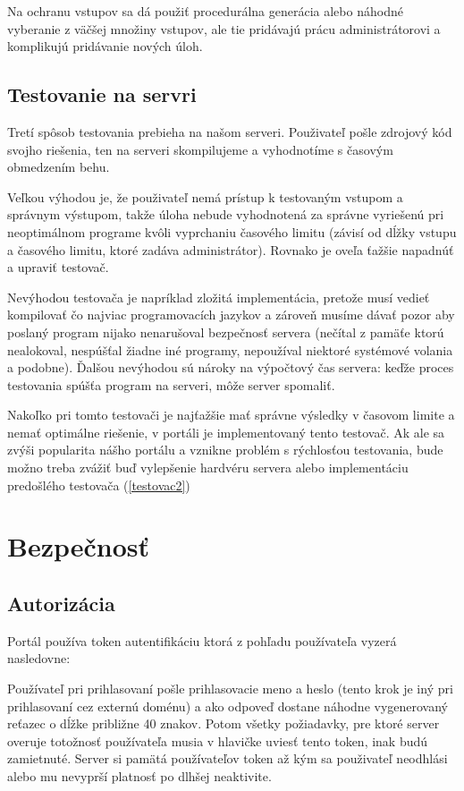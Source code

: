 Na ochranu vstupov sa dá použiť procedurálna generácia alebo náhodné vyberanie z väčšej množiny vstupov, ale tie pridávajú prácu administrátorovi a komplikujú pridávanie nových úloh.

\subsection{Testovanie na servri}
Tretí spôsob testovania prebieha na našom serveri. Použivateľ pošle zdrojový kód svojho riešenia, ten na serveri skompilujeme a vyhodnotíme s časovým obmedzením behu.

Veľkou výhodou je, že použivateľ nemá prístup k testovaným vstupom a správnym výstupom, takže úloha nebude vyhodnotená za správne vyriešenú pri neoptimálnom programe kvôli vyprchaniu časového limitu (závisí od dĺžky vstupu a časového limitu, ktoré zadáva administrátor). Rovnako je oveľa ťažšie napadnúť a upraviť testovač.

Nevýhodou testovača je napríklad zložitá implementácia, pretože musí vedieť kompilovať čo najviac programovacích jazykov a zároveň musíme dávať pozor aby poslaný program nijako nenarušoval bezpečnosť servera (nečítal z pamäťe ktorú nealokoval, nespúšťal žiadne iné programy, nepoužíval niektoré systémové volania a podobne). Ďalšou nevýhodou sú nároky na výpočtový čas servera: keďže proces testovania spúšťa program na serveri, môže server spomaliť.

Nakoľko pri tomto testovači je najťažšie mať správne výsledky v časovom limite a nemať optimálne riešenie, v portáli je implementovaný tento testovač. Ak ale sa zvýši popularita nášho portálu a vznikne problém s rýchlosťou testovania, bude možno treba zvážiť buď vylepšenie hardvéru servera alebo implementáciu predošlého testovača (\ref{testovac2})

\section{Bezpečnosť}
\subsection{Autorizácia}
Portál používa token autentifikáciu ktorá z pohľadu používateľa vyzerá nasledovne:

Používateľ pri prihlasovaní pošle prihlasovacie meno a heslo (tento krok je iný pri prihlasovaní cez externú doménu) a ako odpoveď
dostane náhodne vygenerovaný reťazec o dĺžke približne 40 znakov. Potom všetky požiadavky, pre ktoré server overuje totožnosť používateľa
 musia v hlavičke uviesť tento token, inak budú zamietnuté.
Server si pamätá používateľov token až kým sa použivateľ neodhlási alebo mu nevyprší platnosť po dlhšej neaktivite.

